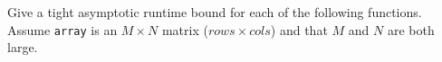 Give a tight asymptotic runtime bound for each of the following functions.
Assume \lstinline$array$ is an $M \times N$ matrix ($rows \times cols$) and that $M$ and $N$ are both large.
